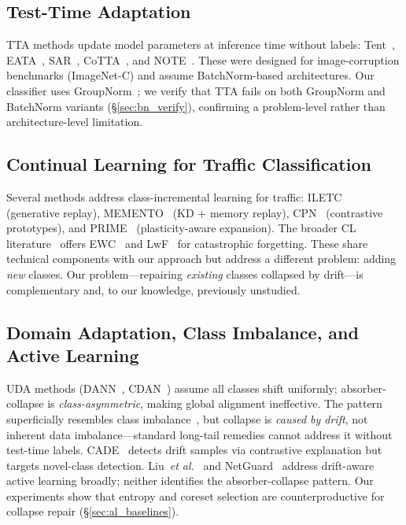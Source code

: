 \documentclass[journal]{IEEEtran}
\makeatletter
\newcommand{\etal}{\textit{et al.}\@}
\makeatother
\begin{document}
\subsection{Test-Time Adaptation}

TTA methods update model parameters at inference time without labels: Tent~\cite{wang2021tent}, EATA~\cite{niu2022eata}, SAR~\cite{niu2023sar}, CoTTA~\cite{wang2022cotta}, and NOTE~\cite{gong2022note}.
These were designed for image-corruption benchmarks (ImageNet-C) and assume BatchNorm-based architectures.
Our classifier uses GroupNorm~\cite{wu2018groupnorm}; we verify that TTA fails on both GroupNorm and BatchNorm variants (\S\ref{sec:bn_verify}), confirming a problem-level rather than architecture-level limitation.

\subsection{Continual Learning for Traffic Classification}

Several methods address class-incremental learning for traffic: ILETC~\cite{zhu2023iletc} (generative replay), MEMENTO~\cite{cerasuolo2024memento} (KD + memory replay), CPN~\cite{cai2024cpn} (contrastive prototypes), and PRIME~\cite{prime2025} (plasticity-aware expansion). The broader CL literature~\cite{delange2022continual} offers EWC~\cite{kirkpatrick2017ewc} and LwF~\cite{li2018lwf} for catastrophic forgetting.
These share technical components with our approach but address a different problem: adding \textit{new} classes. Our problem---repairing \textit{existing} classes collapsed by drift---is complementary and, to our knowledge, previously unstudied.

\subsection{Domain Adaptation, Class Imbalance, and Active Learning}

UDA methods (DANN~\cite{ganin2016dann}, CDAN~\cite{long2018cdan}) assume all classes shift uniformly; absorber-collapse is \textit{class-asymmetric}, making global alignment ineffective.
The pattern superficially resembles class imbalance~\cite{kang2020decoupling, menon2021longtail}, but collapse is \textit{caused by drift}, not inherent data imbalance---standard long-tail remedies cannot address it without test-time labels.
CADE~\cite{yang2021cade} detects drift samples via contrastive explanation but targets novel-class detection.
Liu~\etal{}~\cite{micfoal2023} and NetGuard~\cite{netguard2025} address drift-aware active learning broadly; neither identifies the absorber-collapse pattern. Our experiments show that entropy and coreset selection are counterproductive for collapse repair (\S\ref{sec:al_baselines}).
\end{document}
